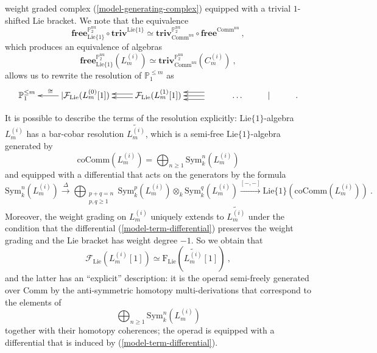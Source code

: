 \documentclass[10pt, oneside]{amsart}
\theoremstyle{plain}
\newcommand{\comm}{\mathrm{Comm}}
\newcommand{\ccomm}{\mathrm{coComm}}
\newcommand{\f}{\mathrm{F}}
\newcommand{\F}{\mathcal{F}}
\newcommand{\Free}{\mathbf{free}}
\newcommand{\lie}{\mathrm{Lie}}
\renewcommand{\nu}{\mathrm{nu}}
\newcommand{\PP}{\mathbb{P}}
\newcommand{\sym}{\mathrm{Sym}}
\newcommand{\Triv}{\mathbf{triv}}
\begin{document}
weight graded complex (\ref{model-generating-complex}) equipped with a trivial $1$-shifted Lie bracket. We note that the
equivalence
\begin{equation*}
\Free^{\PP_2^\nu}_{\lie\{1\}} \circ \Triv^{\lie\{1\}} \simeq \Triv^{\PP_2^\nu}_{\comm^\nu} \circ \Free^{\comm^\nu} \:,
\end{equation*}
which produces an equivalence of algebras
\begin{equation*}
\Free^{\PP_2^\nu}_{\lie\{1\}} (L_m^{(i)}) \simeq \Triv^{\PP_2^\nu}_{\comm^\nu} ( C_m^{(i)} ) \:,
\end{equation*}
allows us to rewrite the resolution of $\PP_1^{\le m}$ as
\[\xymatrix{
\PP_1^{\le m} & | \F_\lie ( L_m^{(0)}[1] ) \ar[l]_(0.6)\cong & \F_\lie  ( L^{(1)}_m[1] ) \ar@<0.5ex>[l]\ar@<-0.5ex>[l] & \ar[l]\ar@<1ex>[l]\ar@<-1ex>[l] & \ldots &| &.
}\]
\begin{remark}\label{model-term-operad}
It is possible to describe the terms of the resolution explicitly: $\lie\{1\}$-algebra $L_m^{(i)}$ has a bar-cobar resolution
$\widetilde{L_m^{(i)}}$, which is a semi-free $\lie\{1\}$-algebra generated by
\begin{equation*}
\ccomm(L_m^{(i)}) = \bigoplus_{n \ge 1} \sym_k^n (L_m^{(i)})
\end{equation*}
and equipped with a differential that acts on the generators by the formula
\begin{equation}\label{model-term-differential}
\sym_k^{n} (L_m^{(i)}) \stackrel{\Delta}{\longrightarrow} \bigoplus_{\substack{p + q = n \\ p,q \ge 1}} \sym_k^p(L_m^{(i)}) \otimes_k \sym_k^q(L_m^{(i)}) \stackrel{[-,-]}{\longrightarrow} \lie\{1\}(\ccomm(L_m^{(i)})) \:.
\end{equation}
Moreover, the weight grading on $L_m^{(i)}$ uniquely extends to $\widetilde{L_m^{(i)}}$ under the condition that the differential
(\ref{model-term-differential}) preserves the weight grading and the Lie bracket has weight degree $-1$. So we obtain that
\begin{equation*}
\F_\lie(L_m^{(i)}[1]) \simeq \f_\lie (\widetilde{L_m^{(i)}}[1]) \:,
\end{equation*}
and the latter has an ``explicit'' description: it is the operad semi-freely generated over $\comm$
by the anti-symmetric homotopy multi-derivations that correspond to the elements of
\begin{equation*}
\bigoplus_{n \ge 1} \sym_k^n (L_m^{(i)})
\end{equation*}
together with their homotopy coherences; the operad is equipped with a differential that is induced by
(\ref{model-term-differential}).
\end{remark}
\end{document}

